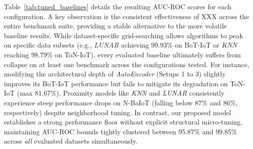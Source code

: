 \documentclass[final,twocolumn,10pt]{elsarticle}
\begin{document}
Table~\ref{tab:tuned_baselines} details the resulting AUC-ROC scores for each configuration. A key observation is the consistent effectiveness of XXX across the entire benchmark suite, providing a stable alternative to the more volatile baseline results. While dataset-specific grid-searching allows algorithms to peak on specific data subsets (e.g., \textit{LUNAR} achieving 99.93\% on BoT-IoT or \textit{KNN} reaching 98.79\% on ToN-IoT), every evaluated baseline ultimately suffers from collapse on at least one benchmark across the configurations tested. For instance, modifying the architectural depth of \textit{AutoEncoder} (Setups 1 to 3) slightly improves its BoT-IoT performance but fails to mitigate its degradation on ToN-IoT (max 81.67\%). Proximity models like \textit{KNN} and \textit{LUNAR} consistently experience steep performance drops on N-BaIoT (falling below 87\% and 86\%, respectively) despite neighborhood tuning. In contrast, our proposed model establishes a strong performance floor without explicit structural micro-tuning, maintaining AUC-ROC bounds tightly clustered between 95.87\% and 99.85\% across \textit{all} evaluated datasets simultaneously.
\end{document}
